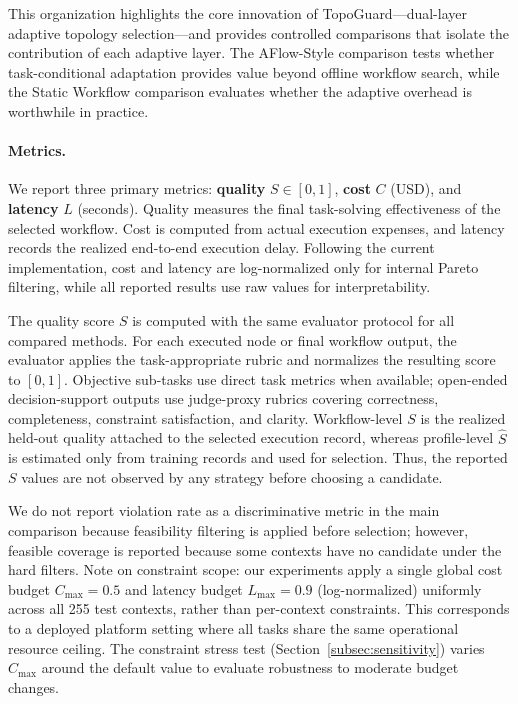 \documentclass[acmsmall,review,anonymous]{acmart}
\begin{document}
This organization highlights the core innovation of TopoGuard---dual-layer adaptive topology selection---and provides controlled comparisons that isolate the contribution of each adaptive layer. The AFlow-Style comparison tests whether task-conditional adaptation provides value beyond offline workflow search, while the Static Workflow comparison evaluates whether the adaptive overhead is worthwhile in practice.


\paragraph{Metrics.}
We report three primary metrics: \textbf{quality} $S\in[0,1]$, \textbf{cost} $C$ (USD), and \textbf{latency} $L$ (seconds).
Quality measures the final task-solving effectiveness of the selected workflow.
Cost is computed from actual execution expenses, and latency records the realized end-to-end execution delay.
Following the current implementation, cost and latency are log-normalized only for internal Pareto filtering, while all reported results use raw values for interpretability.

The quality score $S$ is computed with the same evaluator protocol for all compared methods. For each executed node or final workflow output, the evaluator applies the task-appropriate rubric and normalizes the resulting score to $[0,1]$. Objective sub-tasks use direct task metrics when available; open-ended decision-support outputs use judge-proxy rubrics covering correctness, completeness, constraint satisfaction, and clarity. Workflow-level $S$ is the realized held-out quality attached to the selected execution record, whereas profile-level $\widehat{S}$ is estimated only from training records and used for selection. Thus, the reported $S$ values are not observed by any strategy before choosing a candidate.

We do not report violation rate as a discriminative metric in the main comparison because feasibility filtering is applied before selection; however, feasible coverage is reported because some contexts have no candidate under the hard filters. Note on constraint scope: our experiments apply a single global cost budget $C_{\max}=0.5$ and latency budget $L_{\max}=0.9$ (log-normalized) uniformly across all 255 test contexts, rather than per-context constraints. This corresponds to a deployed platform setting where all tasks share the same operational resource ceiling. The constraint stress test (Section~\ref{subsec:sensitivity}) varies $C_{\max}$ around the default value to evaluate robustness to moderate budget changes.
\end{document}
